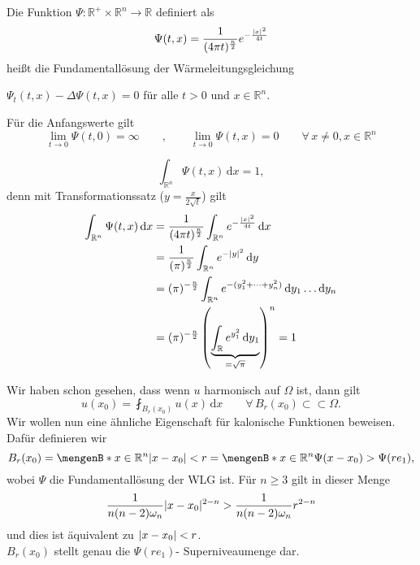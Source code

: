 \begin{definition}
	Die Funktion $\Psi : \mathbb{R}^+ \times \mathbb{R}^n \to \mathbb{R}$ definiert als 
	\[
		\Psi(t,x) = \frac{1}{(4 \pi t)^{\frac{n}{2}}} e^{-\frac{\lvert x\rvert^2}{4t}}
	\]
	heißt die Fundamentallösung der Wärmeleitungsgleichung
\end{definition}
\begin{bemerkung}
	\item $ \Psi_t(t,x) - \Delta \Psi(t,x) = 0$ für alle $t>0$ und $x \in \mathbb{R}^n$.
	\item Für die Anfangswerte gilt
	\[
		\lim_{t \to 0} \Psi(t,0) = \infty \qquad , \qquad \lim_{t \to 0} \Psi(t,x) = 0 \qquad \forall\, x \neq 0, x \in \mathbb{R}^n
	\]
	\item \[
		\int_{\mathbb{R}^n}^{} \Psi(t,x) \,\mathrm{d}x = 1,
	\]
	denn mit Transformationssatz ($ y = \frac{x}{2 \sqrt{t}}$) gilt
	\begin{align*}
		\int_{\mathbb{R}^n}^{}\Psi(t,x) \,\mathrm{d}x &= \frac{1}{(4 \pi t)^{\frac{n}{2}}} \int_{\mathbb{R}^n}^{}e^{-\frac{\lvert x\rvert^2}{4t}} \,\mathrm{d}x \\
		&= \frac{1}{(\pi)^{\frac{n}{2}}} \int_{\mathbb{R}^n}^{} e^{- \lvert y\rvert^2} \,\mathrm{d}y \\
		&= (\pi)^{- \frac{n}{2}} \int_{\mathbb{R}^n}^{} e^{-(y_1^2 + \dots + y_n^2)} \,\mathrm{d}y_1 \dots \mathrm{d}y_n \\
		&= (\pi)^{- \frac{n}{2}} \left( \underset{= \sqrt{\pi}}{\underbrace{\int_{\mathbb{R}}^{} e^{y_1^2} \,\mathrm{d}y_1}} \right)^n = 1
	\end{align*}
\end{bemerkung}
Wir haben schon gesehen, dass wenn $u$ harmonisch auf $\Omega$ ist, dann gilt
\[
	u(x_0) = \fint_{B_r(x_0)}^{} u(x) \,\mathrm{d}x \qquad \forall\, B_r(x_0) \subset \subset \Omega.
\]
Wir wollen nun eine ähnliche Eigenschaft für kalonische Funktionen beweisen. Dafür definieren wir
\[
	B_r(x_0) = \set[x \in \mathbb{R}^n]{\abs{x-x_0}< r} = \set[x \in \mathbb{R}^n]{\Psi(x-x_0) > \Psi(re_1)},
\]
wobei $\Psi$ die Fundamentallösung der WLG ist. Für $n \geq 3$ gilt in dieser Menge
\[
	\frac{1}{n(n-2)\omega_n} \lvert x- x_0\rvert^{2-n} > \frac{1}{n(n-2)\omega_n} r ^{2-n}
\]
und dies ist äquivalent zu $\lvert x-x_0\rvert<r$.\\
$B_r(x_0)$ stellt genau die $\Psi(re_1)$- Superniveaumenge dar.

